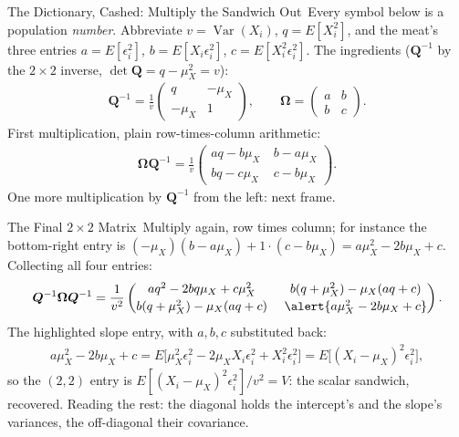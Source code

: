 \documentclass[aspectratio=169,11pt,xcolor=dvipsnames]{beamer}
\DeclareMathOperator{\Var}{Var}
\newcommand{\E}{E}
\newcommand{\Om}{\bm{\Omega}}
\newcommand{\adv}{\,\raisebox{0.6pt}{\textcolor{accent}{$\bigstar$}}}
\begin{document}
\begin{frame}{The Dictionary, Cashed: Multiply the Sandwich Out\adv}
Every symbol below is a population \emph{number}. Abbreviate
$v = \Var(X_i)$, $q = \E[X_i^2]$, and the meat's three entries
$a = \E[\epsilon_i^2]$, $b = \E[X_i\epsilon_i^2]$,
$c = \E[X_i^2\epsilon_i^2]$. The ingredients ($\bm Q^{-1}$ by the
$2\times2$ inverse, $\det\bm Q = q - \mu_X^2 = v$):
\begin{align*}
  \bm Q^{-1} = \frac1v
  \begin{pmatrix} q & -\mu_X \\ -\mu_X & 1 \end{pmatrix},
  \qquad
  \Om = \begin{pmatrix} a & b \\ b & c \end{pmatrix} .
\end{align*}
First multiplication, plain row-times-column arithmetic:
\begin{align*}
  \Om\bm Q^{-1}
  = \frac1v
  \begin{pmatrix}
    aq - b\mu_X & \ b - a\mu_X \\
    bq - c\mu_X & \ c - b\mu_X
  \end{pmatrix} .
\end{align*}
One more multiplication by $\bm Q^{-1}$ from the left: next frame.
\end{frame}

\begin{frame}{The Final $2\times2$ Matrix\adv}
Multiply again, row times column; for instance the bottom-right entry is
$(-\mu_X)(b - a\mu_X) + 1\cdot(c - b\mu_X) = a\mu_X^2 - 2b\mu_X + c$.
Collecting all four entries:
\begin{align*}
  \bm Q^{-1}\Om\bm Q^{-1}
  = \frac{1}{v^2}
  \begin{pmatrix}
    aq^2 - 2bq\mu_X + c\mu_X^2 & \ b(q+\mu_X^2) - \mu_X(aq+c) \\[2pt]
    b(q+\mu_X^2) - \mu_X(aq+c) & \ \alert{a\mu_X^2 - 2b\mu_X + c}
  \end{pmatrix} .
\end{align*}
The highlighted slope entry, with $a,b,c$ substituted back:
\begin{align*}
  a\mu_X^2 - 2b\mu_X + c
  = \E\big[\mu_X^2\epsilon_i^2 - 2\mu_X X_i\epsilon_i^2
    + X_i^2\epsilon_i^2\big]
  = \E\big[(X_i - \mu_X)^2\epsilon_i^2\big] ,
\end{align*}
so the $(2,2)$ entry is $\E[(X_i-\mu_X)^2\epsilon_i^2]/v^2 = V$: the scalar
sandwich, recovered.
\vskip2pt
{\footnotesize Reading the rest: the diagonal holds the intercept's and the
slope's variances, the off-diagonal their covariance.}
\end{frame}
\end{document}
